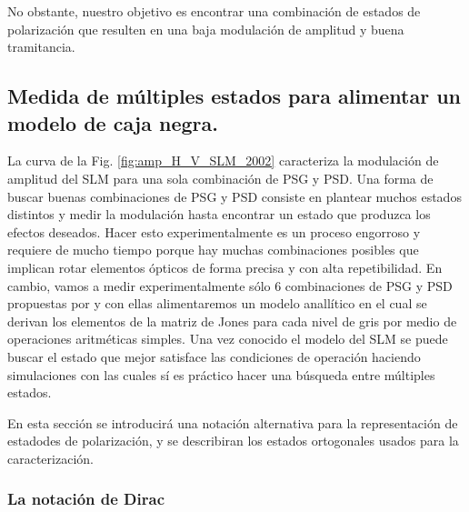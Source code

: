 No obstante, nuestro objetivo es encontrar una combinación de estados
de polarización que resulten en una baja modulación de amplitud y
buena tramitancia. 
\subsection{Medida de múltiples estados para alimentar un modelo de
  caja negra.}
\label{sec:ChGV_med_mod_amp}
La curva de la Fig. \ref{fig:amp_H_V_SLM_2002} caracteriza la modulación de amplitud del SLM para
una sola combinación de PSG y PSD. Una forma de buscar buenas
combinaciones de PSG y PSD consiste en plantear muchos estados
distintos y medir la modulación hasta encontrar un estado que produzca
los efectos deseados. Hacer esto experimentalmente es un proceso
engorroso y requiere de mucho tiempo porque hay muchas combinaciones
posibles que implican rotar elementos ópticos de forma precisa y con
alta repetibilidad. 
En cambio, vamos a medir experimentalmente sólo 6 combinaciones de PSG
y PSD propuestas por  y con
ellas alimentaremos un modelo anallítico en el cual se derivan los elementos de la matriz de
Jones para cada nivel de gris por medio de operaciones aritméticas simples.
Una vez conocido el modelo del SLM se puede buscar el
estado que mejor satisface las condiciones de operación haciendo simulaciones con
las cuales sí es práctico hacer una búsqueda entre múltiples estados.

En esta sección se introducirá una notación alternativa para la
representación de estadodes de polarización, y se describiran los
estados ortogonales usados para la caracterización. 

\subsubsection{La notación de Dirac}

